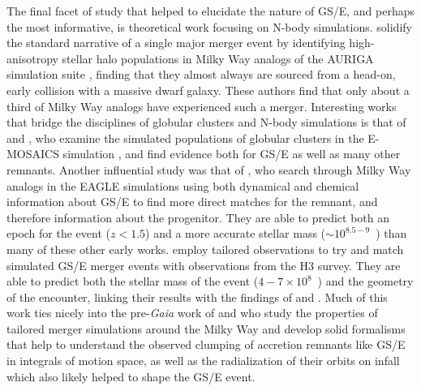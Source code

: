 The final facet of study that helped to elucidate the nature of GS/E, and perhaps the most informative, is theoretical work focusing on N-body simulations. \textcite{fattahi19} solidify the standard narrative of a single major merger event by identifying high-anisotropy stellar halo populations in Milky Way analogs of the AURIGA simulation suite \parencite{grand17}, finding that they almost always are sourced from a head-on, early collision with a massive dwarf galaxy. These authors find that only about a third of Milky Way analogs have experienced such a merger. Interesting works that bridge the disciplines of globular clusters and N-body simulations is that of \textcite{kruijssen19b} and \textcite{kruijssen20}, who examine the simulated populations of globular clusters in the E-MOSAICS simulation \parencite{kruijssen19a}, and find evidence both for GS/E as well as many other remnants. Another influential study was that of \textcite{mackereth19a}, who search through Milky Way analogs in the EAGLE simulations using both dynamical and chemical information about GS/E to find more direct matches for the remnant, and therefore information about the progenitor. They are able to predict both an epoch for the event ($z < 1.5$) and a more accurate stellar mass ($\sim 10^{8.5-9}$~\Msun) than many of these other early works. \textcite{naidu21} employ tailored observations to try and match simulated GS/E merger events with observations from the H3 survey. They are able to predict both the stellar mass of the event ($4-7 \times 10^{8}$~\Msun) and the geometry of the encounter, linking their results with the findings of \textcite{simion19} and \textcite{iorio19}. Much of this work ties nicely into the pre-\textit{Gaia} work of \textcite{amorisco17} and \textcite{jean-baptiste17} who study the properties of tailored merger simulations around the Milky Way and develop solid formalisms that help to understand the observed clumping of accretion remnants like GS/E in integrals of motion space, as well as the radialization of their orbits on infall which also likely helped to shape the GS/E event.

